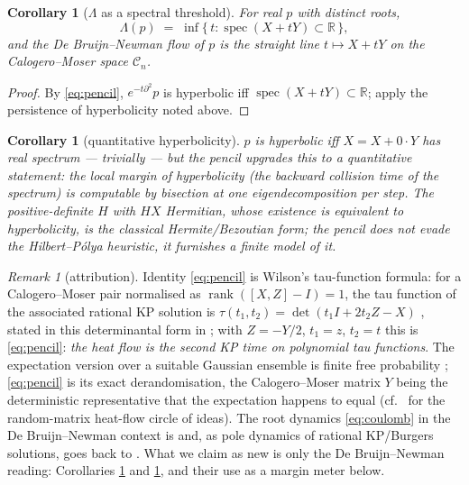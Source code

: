 \documentclass[11pt]{amsart}
\newtheorem{corollary}[theorem]{Corollary}
\theoremstyle{remark}
\newtheorem{remark}[theorem]{Remark}
\newcommand{\R}{\mathbb{R}}
\newcommand{\CM}{\mathcal{C}}
\begin{document}
\begin{corollary}[$\Lambda$ as a spectral threshold]\label{cor:threshold}
For real $p$ with distinct roots,
\[
\Lambda(p)\;=\;\inf\{\,t:\operatorname{spec}(X+tY)\subset\R\,\},
\]
and the De Bruijn--Newman flow of $p$ is the straight line $t\mapsto X+tY$ on the Calogero--Moser space $\CM_n$.
\end{corollary}

\begin{proof}
By \eqref{eq:pencil}, $e^{-t\partial^2}p$ is hyperbolic iff $\operatorname{spec}(X+tY)\subset\R$; apply the persistence of hyperbolicity noted above.
\end{proof}

\begin{corollary}[quantitative hyperbolicity]\label{cor:margin}
$p$ is hyperbolic iff $X=X+0\cdot Y$ has real spectrum --- trivially --- but the pencil upgrades this to a quantitative statement: the local margin of hyperbolicity (the backward collision time of the spectrum) is computable by bisection at one eigendecomposition per step. The positive-definite $H$ with $HX$ Hermitian, whose existence is equivalent to hyperbolicity, is the classical Hermite/Bezoutian form; the pencil does not evade the Hilbert--P\'olya heuristic, it furnishes a finite model of it.
\end{corollary}

\begin{remark}[attribution]\label{rem:attribution}
Identity \eqref{eq:pencil} is Wilson's tau-function formula: for a Calogero--Moser pair normalised as $\operatorname{rank}([X,Z]-I)=1$, the tau function of the associated rational KP solution is $\tau(t_1,t_2)=\det(t_1 I+2t_2 Z-X)$ \cite{Wilson}, stated in this determinantal form in \cite[\S 6.3]{KMG}; with $Z=-Y/2$, $t_1=z$, $t_2=t$ this is \eqref{eq:pencil}: \emph{the heat flow is the second KP time on polynomial tau functions}. The expectation version over a suitable Gaussian ensemble is finite free probability \cite{MSS}; \eqref{eq:pencil} is its exact derandomisation, the Calogero--Moser matrix $Y$ being the deterministic representative that the expectation happens to equal (cf.\ \cite{HallHo} for the random-matrix heat-flow circle of ideas). The root dynamics \eqref{eq:coulomb} in the De Bruijn--Newman context is \cite[Theorem 11]{RT} and, as pole dynamics of rational KP/Burgers solutions, goes back to \cite{AMM}. What we claim as new is only the De Bruijn--Newman reading: Corollaries \ref{cor:threshold} and \ref{cor:margin}, and their use as a margin meter below.
\end{remark}
\end{document}
